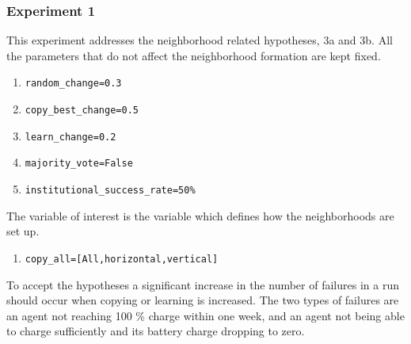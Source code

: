\documentclass[a4paper]{article}
\begin{document}
\subsubsection{Experiment 1}
This experiment addresses the neighborhood related hypotheses, 3a and 3b.  
All the parameters that do not affect the neighborhood formation are kept fixed.
\begin{enumerate}
 \item \begin{alltt}random_change  = 0.3 \end{alltt}
 \item \begin{alltt}copy_best_change = 0.5\end{alltt}
 \item \begin{alltt}learn_change = 0.2\end{alltt}
 \item \begin{alltt}majority_vote = False\end{alltt}
 \item \begin{alltt} institutional_success_rate = 50 \%\end{alltt}
\end{enumerate}
The variable of interest is the variable which defines how the neighborhoods are set up. 
\begin{enumerate}
 \item \begin{alltt}copy_all = [All, horizontal, vertical] \end{alltt}
\end{enumerate}
To accept the hypotheses a significant increase in the number of failures in a run should occur when copying or
learning is increased. The two types of failures are an agent not reaching 100 \%
charge within one week, and an agent not being able to charge sufficiently and its battery charge dropping to zero.
\end{document}
